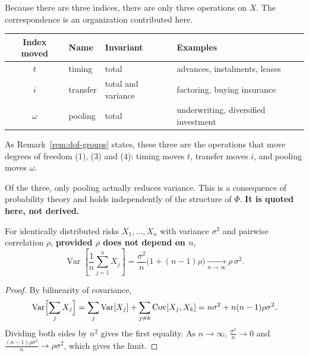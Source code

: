 Because there are three indices, there are only three operations on $X$.
The correspondence is an organization contributed here.

\begin{center}
\begin{tabular}{@{}clll@{}}
\toprule
Index moved & Name & Invariant & Examples \\
\midrule
$t$ & timing & total & advances, instalments, leases \\
$i$ & transfer & total and variance & factoring, buying insurance \\
$\omega$ & pooling & total & underwriting, diversified investment \\
\bottomrule
\end{tabular}
\label{tab:three-ops}
\end{center}

As Remark~\ref{rem:dof-groups} states, these three are the operations that move degrees of
freedom (1), (3) and (4): timing moves $t$, transfer moves $i$, and pooling moves $\omega$.

Of the three, only pooling actually reduces variance. This is a consequence of probability
theory and holds independently of the structure of $\Phi$.
\textbf{It is quoted here, not derived.}

\begin{proposition}
\label{prop:pooling}
For identically distributed risks $X_1,\dots,X_n$ with variance $\sigma^2$ and pairwise
correlation $\rho$, \textbf{provided $\rho$ does not depend on $n$},
\begin{equation}
\operatorname{Var}\!\left[\frac{1}{n}\sum_{j=1}^{n} X_j\right]
= \frac{\sigma^2}{n}\bigl(1+(n-1)\rho\bigr)
\xrightarrow[n\to\infty]{} \rho\,\sigma^2 .
\label{eq:pooling}
\end{equation}
\end{proposition}

\begin{proof}
By bilinearity of covariance,
\[
\operatorname{Var}\Bigl[\sum_j X_j\Bigr]
= \sum_j \operatorname{Var}[X_j] + \sum_{j\neq k}\operatorname{Cov}[X_j,X_k]
= n\sigma^2 + n(n-1)\rho\sigma^2 .
\]
Dividing both sides by $n^2$ gives the first equality. As $n\to\infty$,
$\frac{\sigma^2}{n}\to 0$ and $\frac{(n-1)\rho\sigma^2}{n}\to\rho\sigma^2$, which gives the
limit.
\end{proof}

